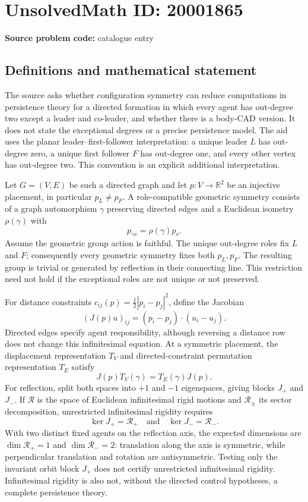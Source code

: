 \documentclass[11pt]{article}
\newcommand{\R}{\mathbb{R}}
\begin{document}
\section*{UnsolvedMath ID: 20001865}
\textbf{Source problem code:} catalogue entry
\subsection{Definitions and mathematical statement}
The source asks whether configuration symmetry can reduce computations in persistence theory for a directed formation in which every agent has out-degree two except a leader and co-leader, and whether there is a body-CAD version. It does not state the exceptional degrees or a precise persistence model. The aid uses the planar leader--first-follower interpretation: a unique leader \(L\) has out-degree zero, a unique first follower \(F\) has out-degree one, and every other vertex has out-degree two. This convention is an explicit additional interpretation.

Let \(G=(V,E)\) be such a directed graph and let \(p:V\to\R^2\) be an injective placement, in particular \(p_L\ne p_F\). A role-compatible geometric symmetry consists of a graph automorphism \(\gamma\) preserving directed edges and a Euclidean isometry \(\rho(\gamma)\) with
\[
 p_{\gamma v}=\rho(\gamma)p_v.
\]
Assume the geometric group action is faithful. The unique out-degree roles fix \(L\) and \(F\); consequently every geometric symmetry fixes both \(p_L,p_F\). The resulting group is trivial or generated by reflection in their connecting line. This restriction need not hold if the exceptional roles are not unique or not preserved.

For distance constraints \(c_{ij}(p)=\frac12|p_i-p_j|^2\), define the Jacobian
\[
 (J(p)u)_{ij}=(p_i-p_j)\cdot(u_i-u_j).
\]
Directed edges specify agent responsibility, although reversing a distance row does not change this infinitesimal equation. At a symmetric placement, the displacement representation \(T_V\) and directed-constraint permutation representation \(T_E\) satisfy
\[
 J(p)T_V(\gamma)=T_E(\gamma)J(p).
\]
For reflection, split both spaces into \(+1\) and \(-1\) eigenspaces, giving blocks \(J_+\) and \(J_-\). If \(\mathcal R\) is the space of Euclidean infinitesimal rigid motions and \(\mathcal R_\pm\) its sector decomposition, unrestricted infinitesimal rigidity requires
\[
 \ker J_+=\mathcal R_+\quad\text{and}\quad
 \ker J_-=\mathcal R_-.
\]
With two distinct fixed agents on the reflection axis, the expected dimensions are \(\dim\mathcal R_+=1\) and \(\dim\mathcal R_-=2\): translation along the axis is symmetric, while perpendicular translation and rotation are antisymmetric. Testing only the invariant orbit block \(J_+\) does not certify unrestricted infinitesimal rigidity. Infinitesimal rigidity is also not, without the directed control hypotheses, a complete persistence theory.
\end{document}
